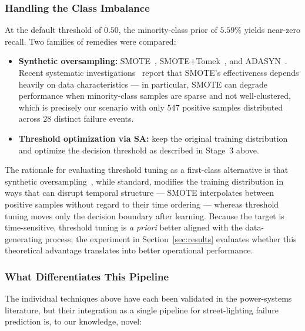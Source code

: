 \documentclass[11pt]{article}
\begin{document}
\subsubsection*{Handling the Class Imbalance}
At the default threshold of $0.50$, the minority-class prior of $5.59\%$ yields near-zero recall. Two families of remedies were compared:

\begin{itemize}[leftmargin=1.5em,itemsep=1pt]
  \item \textbf{Synthetic oversampling:} SMOTE~\cite{chawla2002smote}, SMOTE+Tomek~\cite{batista2004study}, and ADASYN~\cite{he2008adasyn}. Recent systematic investigations~\cite{ieee2022smote} report that SMOTE's effectiveness depends heavily on data characteristics --- in particular, SMOTE can degrade performance when minority-class samples are sparse and not well-clustered, which is precisely our scenario with only $547$ positive samples distributed across $28$ distinct failure events.
  \item \textbf{Threshold optimization via SA:} keep the original training distribution and optimize the decision threshold as described in Stage~$3$ above.
\end{itemize}

The rationale for evaluating threshold tuning as a first-class alternative is that synthetic oversampling~\cite{fernandez2018smote}, while standard, modifies the training distribution in ways that can disrupt temporal structure --- SMOTE interpolates between positive samples without regard to their time ordering --- whereas threshold tuning moves only the decision boundary after learning. Because the target is time-sensitive, threshold tuning is \emph{a priori} better aligned with the data-generating process; the experiment in Section~\ref{sec:results} evaluates whether this theoretical advantage translates into better operational performance.

\subsubsection*{What Differentiates This Pipeline}
The individual techniques above have each been validated in the power-systems literature, but their integration as a single pipeline for street-lighting failure prediction is, to our knowledge, novel:
\end{document}
